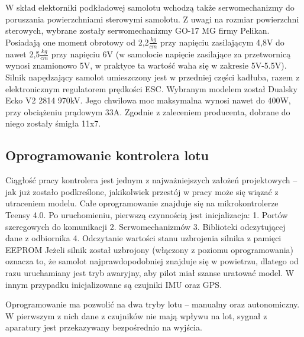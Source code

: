 \documentclass[12pt, a4paper]{article}
\begin{document}
W skład elektorniki podkładowej samolotu wchodzą także serwomechanizmy do poruszania powierzchniami sterowymi samolotu. Z uwagi na rozmiar powierzchni sterowych, wybrane zostały serwomechanizmy GO-17 MG firmy Pelikan. Posiadają one moment obrotowy od 2,2$\frac{kg}{cm}$ przy napięciu zasilającym 4,8V do nawet 2,5$\frac{kg}{cm}$ przy napięciu 6V (w samolocie napięcie zasilające za przetwornicą wynosi znamionowo 5V, w praktyce ta wartość waha się w zakresie 5V-5.5V). Silnik napędzający samolot umieszczony jest w przedniej części kadłuba, razem z elektronicznym regulatorem prędkości ESC. Wybranym modelem został Dualsky Ecko V2 2814 970kV. Jego chwilowa moc maksymalna wynosi nawet do 400W, przy obciążeniu prądowym 33A. Zgodnie z zaleceniem producenta, dobrane do niego zostały śmigła  11x7. 

\FloatBarrier
\subsection{Oprogramowanie kontrolera lotu}
Ciągłość pracy kontrolera jest jednym z najważniejszych założeń projektowych – jak już zostało podkreślone, jakikolwiek przestój w pracy może się wiązać z utraceniem modelu. Całe oprogramowanie znajduje się na mikrokontrolerze Teensy 4.0. Po uruchomieniu, pierwszą czynnością jest inicjalizacja:
1.	Portów szeregowych do komunikacji
2.	Serwomechanizmów 
3.	Biblioteki odczytującej dane z odbiornika
4.	Odczytanie wartości stanu uzbrojenia silnika z pamięci EEPROM
Jeżeli silnik został uzbrojony (włączony z poziomu oprogramowania) oznacza to, że samolot najprawdopodobniej znajduje się w powietrzu, dlatego od razu uruchamiany jest tryb awaryjny, aby pilot miał szanse uratować model. W innym przypadku inicjalizowane są czujniki IMU oraz GPS.

Oprogramowanie ma pozwolić na dwa tryby lotu – manualny oraz autonomiczny. W pierwszym z nich dane z czujników nie mają wpływu na lot, sygnał z aparatury jest przekazywany bezpośrednio na wyjścia.
 
\end{document}

